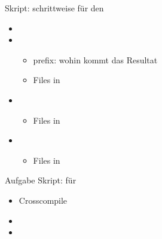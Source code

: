 \begin{frame}{Skript: }{schrittweise für den \host}
 \begin{itemize}
  \item {}
  \item {}
  \begin{itemize}
   \item prefix: wohin kommt das Resultat
   \item Files in 
  \end{itemize}
  \item {}
  \begin{itemize}
   \item Files in 
  \end{itemize}
  \item {}
  \begin{itemize}
   \item Files in 
  \end{itemize}
 \end{itemize}
\end{frame}

\begin{frame}{Aufgabe Skript: }{für \targetS}
 \begin{itemize}
  \item Crosscompile 
  \item {}
  \item {}
 \end{itemize}
\end{frame}
